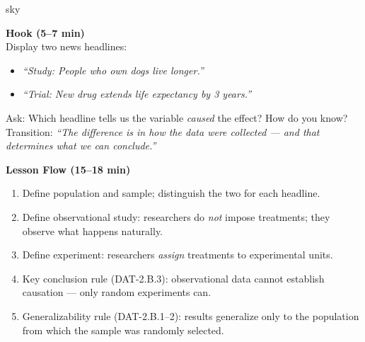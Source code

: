\documentclass[10pt]{article}
\begin{document}
\begin{skillbox}{sky}
\begin{minipage}[t]{0.48\linewidth}
    \textbf{Hook (5--7 min)}\\
    Display two news headlines:
    \begin{itemize}
        \item \textit{``Study: People who own dogs live longer.''}
        \item \textit{``Trial: New drug extends life expectancy by 3 years.''}
    \end{itemize}
    Ask: Which headline tells us the variable \emph{caused} the effect? How do you
    know?\\[4pt]
    Transition: \textit{``The difference is in how the data were collected --- and that
    determines what we can conclude.''}
\end{minipage}
\hfill
\begin{minipage}[t]{0.48\linewidth}
    \textbf{Lesson Flow (15--18 min)}
    \begin{enumerate}
        \item Define population and sample; distinguish the two for each headline.
        \item Define observational study: researchers do \emph{not} impose treatments;
              they observe what happens naturally.
        \item Define experiment: researchers \emph{assign} treatments to experimental
              units.
        \item Key conclusion rule (DAT-2.B.3): observational data cannot establish
              causation --- only random experiments can.
        \item Generalizability rule (DAT-2.B.1--2): results generalize only to the
              population from which the sample was randomly selected.
    \end{enumerate}
\end{minipage}
\end{skillbox}
\end{document}

